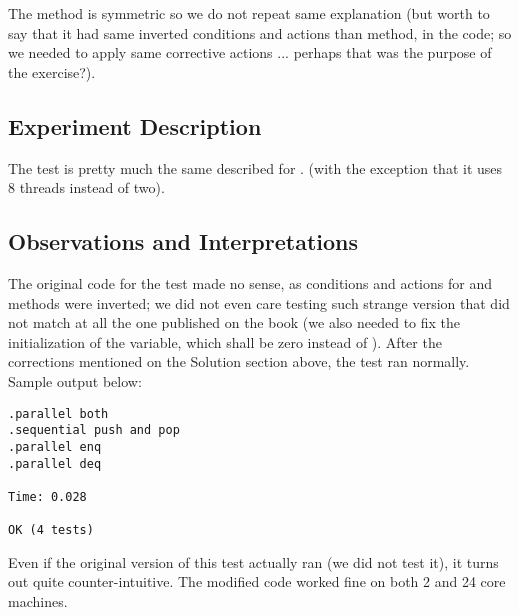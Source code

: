 The  method is symmetric so we do not repeat same explanation
(but worth to say that it had same inverted conditions and actions
than  method, in the code; so we needed to apply same
corrective actions ... perhaps that was the purpose of the exercise?).

\subsection{Experiment Description}
The test is pretty much the same described for .
(with the exception that it uses 8 threads instead of two).

\subsection{Observations and Interpretations}
The original code for the test made no sense, as conditions and
actions for  and  methods were inverted; we did not even
care testing such strange version that did not match at all the one
published on the book (we also needed to fix the initialization of the
 variable, which shall be zero instead of ). After
the corrections mentioned on the Solution section above, the test ran
normally. Sample output below: 

\begin{verbatim}
.parallel both
.sequential push and pop
.parallel enq
.parallel deq

Time: 0.028

OK (4 tests)
\end{verbatim}
\hfill

Even if the original version of this test actually ran (we did not
test it), it turns out quite counter-intuitive. The modified code worked fine
on both 2 and 24 core machines.


